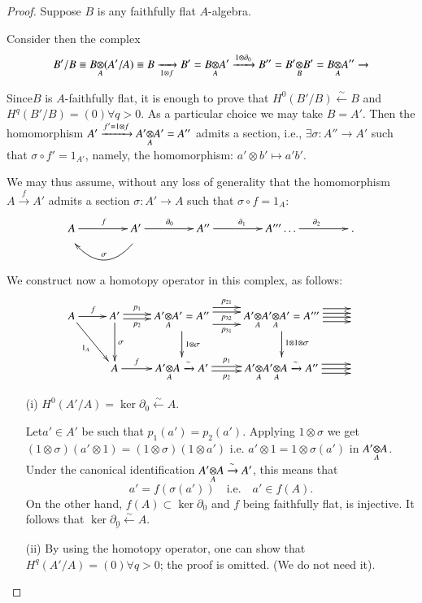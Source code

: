 \begin{proof}
Suppose $B$ is any faithfully flat $A$-algebra.

Consider then the complex
$$
B'/B\equiv \foprod{B}{(A'/A)}{A}\equiv B\xrightarrow[1\otimes
  f]{}B'=\foprod{B}{A'}{A}\xrightarrow{1\otimes
  \partial_{0}}B''=\foprod{B'}{B'}{B}=\foprod{B}{A''}{A}\to 
$$

Since\pageoriginale $B$ is $A$-faithfully flat, it is enough to prove
that $H^{0}(B'/B)\xleftarrow{\sim}B$ and $H^{q}(B'/B)=(0)\forall
q>0$. As a particular choice we may take $B=A'$. Then the homomorphism
$A'\xrightarrow{f'=1\otimes f}\foprod{A'}{A'}{A}=A''$ admits a
section, i.e., $\exists \sigma :A''\to A'$ such that
$\sigma\circ f'=1_{A'}$, namely, the homomorphism: $a'\otimes b'\mapsto
a'b'$.

We may thus assume, without any loss of generality that the
homomorphism $A\xrightarrow{f}A'$ admits a section $\sigma:A'\to A$
such that $\sigma\circ f=1_{A}$:
\[
\xymatrix@R=0pt@C=1.5cm{
A\ar[r]^{f} & A'\ar[r]^{\partial_{0}} & A''\ar[r]^{\partial_{1}} &
A'''\ar[r]^{\partial_{2}}\ldots &.\\
 & \ar@/^1.5pc/[l]_{\sigma} &  
}
\]

We construct now a homotopy operator in this complex, as follows:
\[
\xymatrix{
A\ar[r]^{f}\ar[dr]_{1_{A}} &
A'\ar@<.2em>[r]^-{p_{1}}\ar@<-.2em>[r]_-{p_{2}}\ar[d]^{\sigma} &
\foprod{A'}{A'}{A}=A''\ar[d]^-{1\otimes\sigma} 
\ar@<.4em>[r]_-{p_{32}}\ar@<.8em>[r]^-{p_{21}}\ar@<-.7em>[r]_-{p_{31}} &
\foprod{A'}{\foprod{A'}{A'}{A}}{A}=A'''\ar[d]^{1\otimes 1\otimes
  \sigma} \ar@<.7em>[r]\ar@<.3em>[r]\ar@<-.05em>[r]\ar@<-.45em>[r] & \\
& A\ar[r]^-{f} & \foprod{A'}{A}{A}\xrightarrow{\sim}A'
\ar@<.2em>[r]^-{p_{1}}\ar@<-.2em>[r]_-{p_{2}} &
\foprod{A'}{\foprod{A'}{A}{A}}{A}\xrightarrow{\sim}A'' 
\ar[r]\ar@<.4em>[r]\ar@<-.4em>[r] & 
}
\]

\begin{itemize}
\item[(i)] $H^{0}(A'/A)=\ker \partial_{0}\xleftarrow{\sim}A$.

Let\pageoriginale $a'\in A'$ be such that
$p_{1}(a')=p_{2}(a')$. Applying $1\otimes 
\sigma$ we get $(1\otimes\sigma)(a'\otimes
1)=(1\otimes\sigma)(1\otimes a')$ i.e. $a'\otimes 1=1\otimes
\sigma(a')$ in $\foprod{A'}{A}{A}$. Under the canonical identification
$\foprod{A'}{A}{A}\xrightarrow{\sim}A'$, this means that
$$
a'=f(\sigma(a'))\quad\text{i.e.}\quad a'\in f(A).
$$
On the other hand, $f(A)\subset \ker \partial_{0}$ and $f$ being
faithfully flat, is injective. It follows that $\underline{\ker
  \partial_{0}\xleftarrow{\sim}A}$. 

\item[(ii)] By using the homotopy operator, one can show that
  $H^{q}(A'/A)=(0)\forall q>0$; the proof is omitted. (We do not need it).
\end{itemize}
\end{proof}

